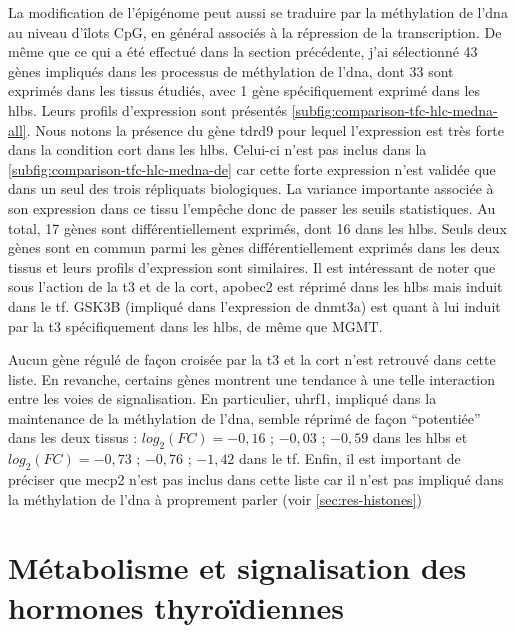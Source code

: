 \documentclass[../main.tex]{subfiles}
\begin{document}
	La modification de l'épigénome peut aussi se traduire par la méthylation de l'\gls{dna} au niveau d'îlots CpG, en général associés à la répression de la transcription.
	De même que ce qui a été effectué dans la section précédente, j'ai sélectionné 43 gènes impliqués dans les processus de méthylation de l'\gls{dna}, dont 33 sont exprimés dans les tissus étudiés, avec 1 gène spécifiquement exprimé dans les \glspl{hlb}.
	Leurs profils d'expression sont présentés \autoref{subfig:comparison-tfc-hlc-medna-all}.
	Nous notons la présence du gène \gls{tdrd9} pour lequel l'expression est très forte dans la condition \gls{cort} dans les \glspl{hlb}.
	Celui-ci n'est pas inclus dans la \autoref{subfig:comparison-tfc-hlc-medna-de} car cette forte expression n'est validée que dans un seul des trois répliquats biologiques.
	La variance importante associée à son expression dans ce tissu l'empêche donc de passer les seuils statistiques.
	Au total, 17 gènes sont différentiellement exprimés, dont 16 dans les \glspl{hlb}.
	Seuls deux gènes sont en commun parmi les gènes différentiellement exprimés dans les deux tissus et leurs profils d'expression sont similaires.
	Il est intéressant de noter que sous l'action de la \gls{t3} et de la \gls{cort}, \gls{apobec2} est réprimé dans les \glspl{hlb} mais induit dans le \gls{tf}.
	GSK3B (impliqué dans l'expression de \gls{dnmt3a}) est quant à lui induit par la \gls{t3} spécifiquement dans les \glspl{hlb}, de même que MGMT.
	\par
	Aucun gène régulé de façon croisée par la \gls{t3} et la \gls{cort} n'est retrouvé dans cette liste.
	En revanche, certains gènes montrent une tendance à une telle interaction entre les voies de signalisation.
	En particulier, \gls{uhrf1}, impliqué dans la maintenance de la méthylation de l'\gls{dna}, semble réprimé de façon ``potentiée'' dans les deux tissus :
	$log_2(FC)=-0,16$ ; $-0,03$ ; $-0,59$ dans les \glspl{hlb} et $log_2(FC)=-0,73$ ; $-0,76$ ; $-1,42$ dans le \gls{tf}.
	Enfin, il est important de préciser que \gls{mecp2} n'est pas inclus dans cette liste car il n'est pas impliqué dans la méthylation de l'\gls{dna} à proprement parler (voir \autoref{sec:res-histones})

	


\section{Métabolisme et signalisation des hormones thyroïdiennes}
\end{document}
